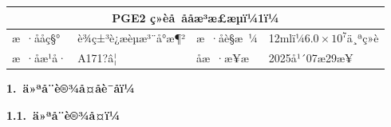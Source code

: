 \documentclass[UTF8,10pt,a4paper,fontset=fandol]{ctexart}
\newcommand{\fieldvalue}[1]{#1}
\newcommand{\handwritten}[1]{#1}
\begin{document}
\begin{tabularx}{\textwidth}{|l|X|l|X|}
\hline
\multicolumn{4}{|c|}{PGE2 ç»èå å­åæ³æ£æµï¼1ï¼} \\ \hline
æ ·ååç§° &
\fieldvalue{è¾ç±³è¿æèµæ³¨å°æ¶²} &
æ ·åè§æ ¼ &
\fieldvalue{12mlï¼$6.0\times10^{7}$ä¸ªç»è} \\ \hline
æ ·åæ¹å· &
\fieldvalue{\handwritten{A171?â¦}} &
åæ ·æ¥æ &
\fieldvalue{\handwritten{2025å¹´07æ29æ¥}} \\ \hline
\end{tabularx}

\textbf{1.\ ä»ªå¨è®¾å¤åè¯åï¼}

\textbf{1.1.\ ä»ªå¨è®¾å¤ï¼}
\end{document}
